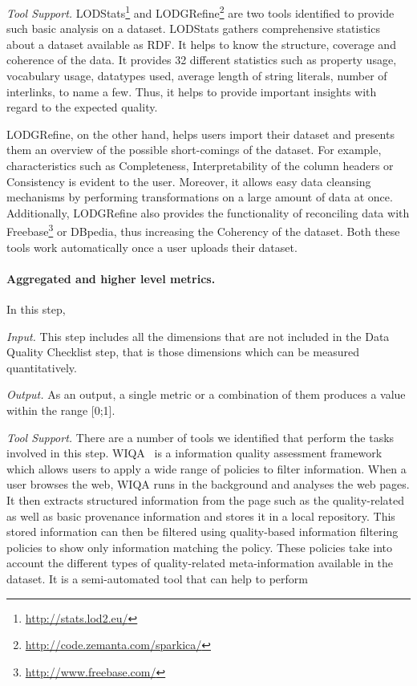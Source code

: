 \emph{Tool Support.} LODStats\footnote{\url{http://stats.lod2.eu/}} and LODGRefine\footnote{\url{http://code.zemanta.com/sparkica/}} are two tools identified to provide such basic analysis on a dataset.
LODStats gathers comprehensive statistics about a dataset available as RDF. 
It helps to know the structure, coverage and coherence of the data. 
It provides 32 different statistics such as property usage, vocabulary usage, datatypes used, average length of string literals, number of interlinks, to name a few. 
Thus, it helps to provide important insights with regard to the expected quality.

LODGRefine, on the other hand, helps users import their dataset and presents them an overview of the possible short-comings of the dataset. 
For example, characteristics such as Completeness,  Interpretability of the column headers or Consistency is evident to the user. 
Moreover, it allows easy data cleansing mechanisms by performing transformations on a large amount of data at once. 
Additionally, LODGRefine also provides the functionality of reconciling data with Freebase\footnote{\url{http://www.freebase.com/}} or DBpedia, thus increasing the Coherency of the dataset.
Both these tools work automatically once a user uploads their dataset.

\paragraph{\textbf{Aggregated and higher level metrics.}} 
In this step, 

\emph{Input.} This step includes all the dimensions that are not included in the Data Quality Checklist step, that is those dimensions which can be measured quantitatively.   

\emph{Output.} 
As an output, a single metric or a combination of them produces a value within the range [0;1]. 

\emph{Tool Support.} 
There are a number of tools we identified that perform the tasks involved in this step. 
WIQA~\cite{Bizer} is a information quality assessment framework which allows users to apply a wide range of policies to filter information. 
When a user browses the web, WIQA runs in the background and analyses the web pages. 
It then extracts structured information from the page such as the quality-related as well as basic provenance information and stores it in a local repository. 
This stored information can then be filtered using quality-based information filtering policies to show only information matching the policy. 
These policies take into account the different types of quality-related meta-information available in the dataset. 
It is a semi-automated tool that can help to perform 

